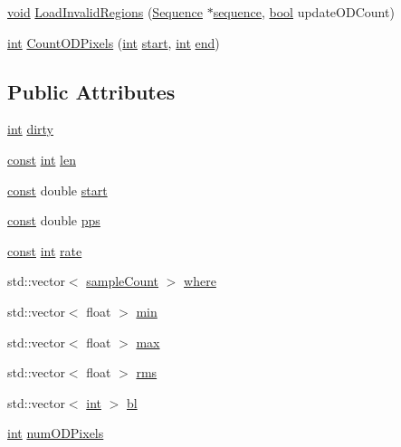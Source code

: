 \begin{DoxyCompactItemize}
\item 
\hyperlink{sound_8c_ae35f5844602719cf66324f4de2a658b3}{void} \hyperlink{class_wave_cache_a89f42ad868db2ec9d4d399d20c651309}{Load\+Invalid\+Regions} (\hyperlink{class_sequence}{Sequence} $\ast$\hyperlink{seqmwrite_8c_aa85df2bb76931a50df646c42ac67b112}{sequence}, \hyperlink{mac_2config_2i386_2lib-src_2libsoxr_2soxr-config_8h_abb452686968e48b67397da5f97445f5b}{bool} update\+O\+D\+Count)
\item 
\hyperlink{xmltok_8h_a5a0d4a5641ce434f1d23533f2b2e6653}{int} \hyperlink{class_wave_cache_a5b4c25e83010cc594710f7da115d0406}{Count\+O\+D\+Pixels} (\hyperlink{xmltok_8h_a5a0d4a5641ce434f1d23533f2b2e6653}{int} \hyperlink{class_wave_cache_a1dd0d05d0ee3d2f5da2a22c5effcff84}{start}, \hyperlink{xmltok_8h_a5a0d4a5641ce434f1d23533f2b2e6653}{int} \hyperlink{convtest_8m_afb358f48b1646c750fb9da6c6585be2b}{end})
\end{DoxyCompactItemize}
\subsection*{Public Attributes}
\begin{DoxyCompactItemize}
\item 
\hyperlink{xmltok_8h_a5a0d4a5641ce434f1d23533f2b2e6653}{int} \hyperlink{class_wave_cache_abee5a8da780defb99cfab2cb9608b618}{dirty}
\item 
\hyperlink{getopt1_8c_a2c212835823e3c54a8ab6d95c652660e}{const} \hyperlink{xmltok_8h_a5a0d4a5641ce434f1d23533f2b2e6653}{int} \hyperlink{class_wave_cache_aadcb69c211509b3de0105d521dd50b9c}{len}
\item 
\hyperlink{getopt1_8c_a2c212835823e3c54a8ab6d95c652660e}{const} double \hyperlink{class_wave_cache_a1dd0d05d0ee3d2f5da2a22c5effcff84}{start}
\item 
\hyperlink{getopt1_8c_a2c212835823e3c54a8ab6d95c652660e}{const} double \hyperlink{class_wave_cache_a523eaf00e1e99a48767664d38405b68f}{pps}
\item 
\hyperlink{getopt1_8c_a2c212835823e3c54a8ab6d95c652660e}{const} \hyperlink{xmltok_8h_a5a0d4a5641ce434f1d23533f2b2e6653}{int} \hyperlink{class_wave_cache_ac48cb51744b60852d389473425c4192b}{rate}
\item 
std\+::vector$<$ \hyperlink{include_2audacity_2_types_8h_afa427e1f521ea5ec12d054e8bd4d0f71}{sample\+Count} $>$ \hyperlink{class_wave_cache_af7df2954eebfc2644b127954f320066d}{where}
\item 
std\+::vector$<$ float $>$ \hyperlink{class_wave_cache_ae4c8765b5c8a9a7a9422135c378061fe}{min}
\item 
std\+::vector$<$ float $>$ \hyperlink{class_wave_cache_a38026831cc4f78f4ff5b2cc2c2b264cc}{max}
\item 
std\+::vector$<$ float $>$ \hyperlink{class_wave_cache_aeb21938e68b6a79b79566f1a3320d8e3}{rms}
\item 
std\+::vector$<$ \hyperlink{xmltok_8h_a5a0d4a5641ce434f1d23533f2b2e6653}{int} $>$ \hyperlink{class_wave_cache_a122c1153962ae8d4b5e12810f2867bf0}{bl}
\item 
\hyperlink{xmltok_8h_a5a0d4a5641ce434f1d23533f2b2e6653}{int} \hyperlink{class_wave_cache_adaf6da5f57fd744a22bc753e4f7a4d73}{num\+O\+D\+Pixels}
\end{DoxyCompactItemize}
